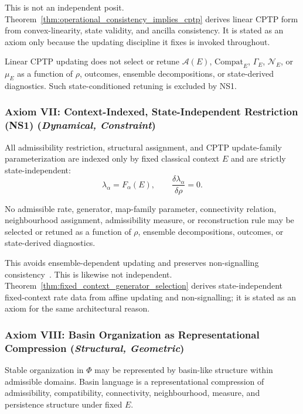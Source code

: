 \documentclass[aps,prx,onecolumn,11pt]{revtex4-2}
\theoremstyle{plain}
\theoremstyle{definition}
\theoremstyle{remark}
\begin{document}
This is not an independent posit.
Theorem~\ref{thm:operational_consistency_implies_cptp} derives linear
CPTP form from convex-linearity, state validity, and ancilla
consistency. It is stated as an axiom only because the updating
discipline it fixes is invoked throughout.

Linear CPTP updating does not select or retune \(\mathcal A(E)\),
\(\mathrm{Compat}_E\), \(\Gamma_E\), \(\mathcal N_E\), or \(\mu_E\) as
a function of \(\rho\), outcomes, ensemble decompositions, or
state-derived diagnostics. Such state-conditioned retuning is excluded
by NS1.

\subsubsection*{Axiom VII: Context-Indexed, State-Independent
Restriction (NS1) \;(\textit{Dynamical, Constraint})}
\label{ax:NS1}

All admissibility restriction, structural assignment, and CPTP
update-family parameterization are indexed only by fixed classical
context \(E\) and are strictly state-independent:
\[
\lambda_\alpha = F_\alpha(E),
\qquad
\frac{\delta\lambda_\alpha}{\delta\rho}=0.
\]

No admissible rate, generator, map-family parameter, connectivity
relation, neighbourhood assignment, admissibility measure, or
reconstruction rule may be selected or retuned as a function of
\(\rho\), ensemble decompositions, outcomes, or state-derived
diagnostics.

This avoids ensemble-dependent updating and preserves non-signalling
consistency~\cite{Gisin1989,Gisin1990,Polchinski1991}. This is likewise
not independent. Theorem~\ref{thm:fixed_context_generator_selection}
derives state-independent fixed-context rate data from affine updating
and non-signalling; it is stated as an axiom for the same architectural
reason.

\subsubsection*{Axiom VIII: Basin Organization as Representational
Compression \;(\textit{Structural, Geometric})}
\label{ax:basin_representational_compression}

Stable organization in \(\Phi\) may be represented by basin-like
structure within admissible domains. Basin language is a
representational compression of admissibility, compatibility,
connectivity, neighbourhood, measure, and persistence structure under
fixed \(E\).
\end{document}

